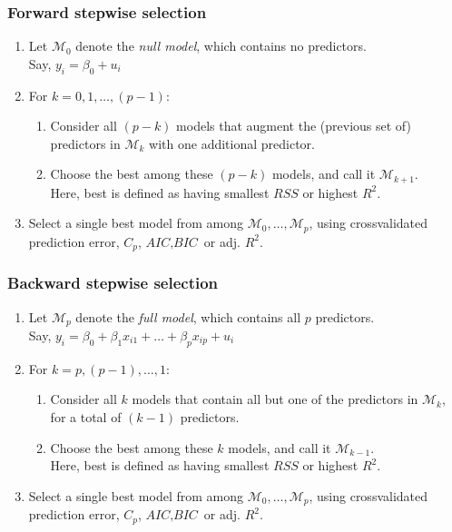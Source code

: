\documentclass{beamer}
\begin{document}
\begin{frame}
\frametitle{Forward stepwise selection}

\begin{enumerate}
  \item Let $\mathcal{M}_0$ denote the \textit{null model}, which contains no predictors.
  \\Say, $y_i=\beta_0+u_i$
  \item For $k=0,1, \dots , \left(p-1\right)$:
\begin{enumerate}[{(a)}]
  \item Consider all $(p-k)$ models that augment the (previous set of) predictors in $\mathcal{M}_k$ with one additional predictor.
  \item Choose the best among these $(p-k)$ models, and call it $\mathcal{M}_{k+1}$.
        \\Here, best is defined as having smallest $\textit{RSS}$ or highest $R^2$.
\end{enumerate}
  \item Select a single best model from among $\mathcal{M}_0, \dots, \mathcal{M}_{p}$, using crossvalidated
prediction error, $C_p$, $\textit{AIC}, \textit{BIC}$ or adj. $R^2$.
\end{enumerate}

\end{frame}

\begin{frame}
\frametitle{Backward stepwise selection}

\begin{enumerate}
  \item Let $\mathcal{M}_p$ denote the \textit{full model}, which contains all $p$ predictors.
  \\Say, $y_i=\beta_0+ \beta_1x_{i1} + \dots + \beta_px_{ip} + u_i$
  \item For $k=p, (p-1), \dots , 1$:
\begin{enumerate}[{(a)}]
  \item Consider all $k$ models that contain all but one of the predictors
in $\mathcal{M}_k$, for a total of $(k-1)$ predictors.
  \item Choose the best among these $k$ models, and call it $\mathcal{M}_{k-1}$.
        \\Here, best is defined as having smallest $\textit{RSS}$ or highest $R^2$.
\end{enumerate}
  \item Select a single best model from among $\mathcal{M}_0, \dots, \mathcal{M}_{p}$, using crossvalidated
prediction error, $C_p$, $\textit{AIC}, \textit{BIC}$ or adj. $R^2$.
\end{enumerate}

\end{frame}
\end{document}
